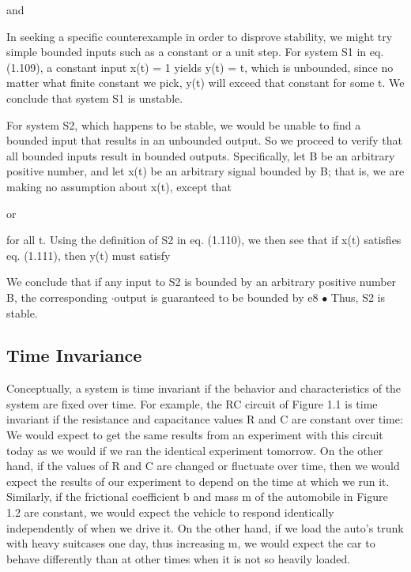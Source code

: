 \documentclass{report}
\begin{document}
and



In seeking a specific counterexample in order to disprove stability, we might try simple bounded inputs such as a constant or a unit step. For system
S1 in eq. (1.109), a constant input x(t) = 1 yields y(t) = t, which is unbounded, since no matter what finite constant we pick, y(t) will exceed
that constant for some t. We conclude that system S1 is unstable.

For system S2, which happens to be stable, we would be unable to find a bounded input that results in an unbounded output. So we proceed to verify
that all bounded inputs result in bounded outputs. Specifically, let B be an arbitrary positive number, and let x(t) be an arbitrary signal bounded
by B; that is, we are making no assumption about x(t), except that



or



for all t. Using the definition of S2 in eq. (1.110), we then see that if x(t) satisfies eq. (1.111), then y(t) must satisfy

We conclude that if any input to S2 is bounded by an arbitrary positive number B, the corresponding $\cdot $output is guaranteed to be bounded by
e8 $\bullet $ Thus, S2 is stable.

\subsection*{Time Invariance}

Conceptually, a system is time invariant if the behavior and characteristics of the system are fixed over time. For example, the RC circuit of Figure
1.1 is time invariant if the resistance and capacitance values R and C are constant over time: We would expect to get the same results from an experiment
with this circuit today as we would if we ran the identical experiment tomorrow. On the other hand, if the values of R and C are changed or fluctuate
over time, then we would expect the results of our experiment to depend on the time at which we run it. Similarly, if the frictional coefficient
b and mass m of the automobile in Figure 1.2 are constant, we would expect the vehicle to respond identically independently of when we drive it.
On the other hand, if we load the auto{'}s trunk with heavy suitcases one day, thus increasing m, we would expect the car to behave differently than
at other times when it is not so heavily loaded.
\end{document}
